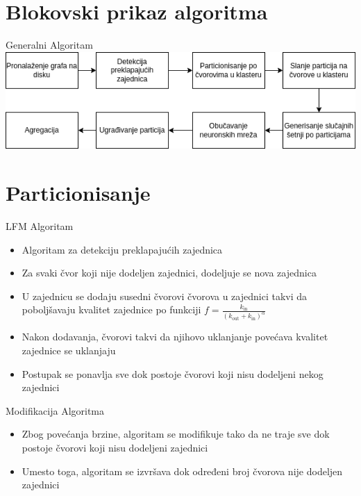 \documentclass{beamer}
\begin{document}
\section{Blokovski prikaz algoritma}
\begin{frame}{Generalni Algoritam}
    \includegraphics[width=\textwidth]{./png/Blokovski prikaz algoritma.drawio.png}
\end{frame}

\section{Particionisanje}
\begin{frame}{LFM Algoritam}
    \begin{itemize}
        \item Algoritam za detekciju preklapajućih zajednica 
        \item Za svaki čvor koji nije dodeljen zajednici, dodeljuje se nova zajednica 
        \item U zajednicu se dodaju susedni čvorovi čvorova u zajednici takvi da poboljšavaju kvalitet zajednice po funkciji $ f = \frac{k_\text{in}}{(k_\text{out} + k_\text{in})^\alpha} $ 
        \item Nakon dodavanja, čvorovi takvi da njihovo uklanjanje povećava kvalitet zajednice se uklanjaju
        \item Postupak se ponavlja sve dok postoje čvorovi koji nisu dodeljeni nekog zajednici
    \end{itemize}
\end{frame}

\begin{frame}{Modifikacija Algoritma}
    \begin{itemize}
        \item Zbog povećanja brzine, algoritam se modifikuje tako da ne traje sve dok postoje čvorovi koji nisu dodeljeni zajednici
        \item Umesto toga, algoritam se izvršava dok određeni broj čvorova nije dodeljen zajednici
    \end{itemize}
\end{frame}
\end{document}
